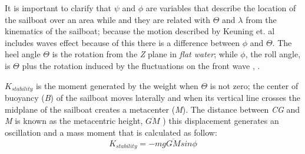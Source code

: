 
It is important to clarify that $\psi$ and $\phi$ are variables that describe the location of the sailboat over an area while and they are related with $\Theta$ and $\lambda$ from the kinematics of the sailboat; because the motion described by Keuning et. al \cite{keuning2004mathematical} includes waves effect because of this there is a difference between $\phi$ and $\Theta$. The heel angle $\Theta$ is the rotation from the \textit{Z} plane in \textit{flat water}; while $\phi$, the roll angle, is $\Theta$ plus the rotation induced by the fluctuations on the front wave \cite{kimball2009physics}, \cite{denny2009float}. \par 
\textit{ $ K_{stability} $ } is the moment generated by the weight when $\Theta$ is not zero; the center of buoyancy (\textit{B}) of the sailboat moves laterally and when its vertical line crosses the midplane of the sailboat creates a metacenter (\textit{M}). The distance between \textit{CG} and \textit{M} is known as the metacentric height, \textit{$\overline{GM}$} ) \cite{patterson2014ship} this displacement generates an oscillation and a mass moment that is calculated as follow:
\begin{equation} \label{eq:k_stability}
    K_{stability}=-mg\overline{GM} sin \phi 
\end{equation}


